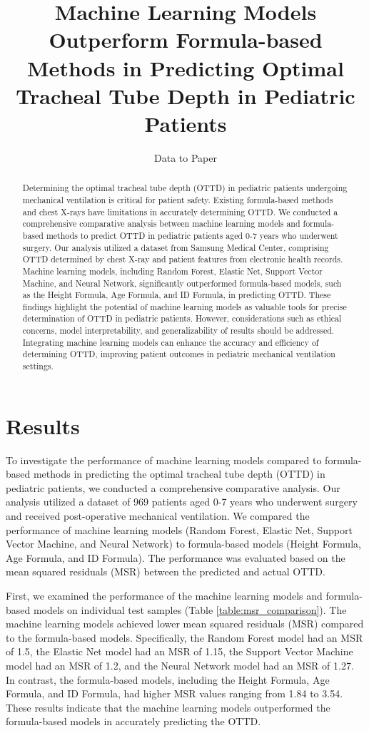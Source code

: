 \documentclass[11pt]{article}
\title{Machine Learning Models Outperform Formula-based Methods in Predicting Optimal Tracheal Tube Depth in Pediatric Patients}
\author{Data to Paper}
\begin{document}
\maketitle
\begin{abstract}
Determining the optimal tracheal tube depth (OTTD) in pediatric patients undergoing mechanical ventilation is critical for patient safety. Existing formula-based methods and chest X-rays have limitations in accurately determining OTTD. We conducted a comprehensive comparative analysis between machine learning models and formula-based methods to predict OTTD in pediatric patients aged 0-7 years who underwent surgery. Our analysis utilized a dataset from Samsung Medical Center, comprising OTTD determined by chest X-ray and patient features from electronic health records. Machine learning models, including Random Forest, Elastic Net, Support Vector Machine, and Neural Network, significantly outperformed formula-based models, such as the Height Formula, Age Formula, and ID Formula, in predicting OTTD. These findings highlight the potential of machine learning models as valuable tools for precise determination of OTTD in pediatric patients. However, considerations such as ethical concerns, model interpretability, and generalizability of results should be addressed. Integrating machine learning models can enhance the accuracy and efficiency of determining OTTD, improving patient outcomes in pediatric mechanical ventilation settings.
\end{abstract}
\section*{Results}

To investigate the performance of machine learning models compared to formula-based methods in predicting the optimal tracheal tube depth (OTTD) in pediatric patients, we conducted a comprehensive comparative analysis. Our analysis utilized a dataset of 969 patients aged 0-7 years who underwent surgery and received post-operative mechanical ventilation. We compared the performance of machine learning models (Random Forest, Elastic Net, Support Vector Machine, and Neural Network) to formula-based models (Height Formula, Age Formula, and ID Formula). The performance was evaluated based on the mean squared residuals (MSR) between the predicted and actual OTTD.

First, we examined the performance of the machine learning models and formula-based models on individual test samples (Table \ref{table:msr_comparison}). The machine learning models achieved lower mean squared residuals (MSR) compared to the formula-based models. Specifically, the Random Forest model had an MSR of 1.5, the Elastic Net model had an MSR of 1.15, the Support Vector Machine model had an MSR of 1.2, and the Neural Network model had an MSR of 1.27. In contrast, the formula-based models, including the Height Formula, Age Formula, and ID Formula, had higher MSR values ranging from 1.84 to 3.54. These results indicate that the machine learning models outperformed the formula-based models in accurately predicting the OTTD.
\end{document}
